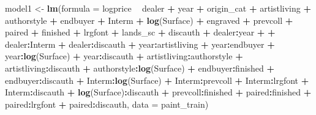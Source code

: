 \documentclass[]{article}
\newenvironment{Shaded}{\begin{snugshade}}{\end{snugshade}}
\newcommand{\DataTypeTok}[1]{\textcolor[rgb]{0.13,0.29,0.53}{#1}}
\newcommand{\KeywordTok}[1]{\textcolor[rgb]{0.13,0.29,0.53}{\textbf{#1}}}
\newcommand{\NormalTok}[1]{#1}
\newcommand{\OperatorTok}[1]{\textcolor[rgb]{0.81,0.36,0.00}{\textbf{#1}}}
\newcommand{\StringTok}[1]{\textcolor[rgb]{0.31,0.60,0.02}{#1}}
\begin{document}
\begin{Shaded}
\begin{Highlighting}[]
\NormalTok{model1 <-}\StringTok{ }\KeywordTok{lm}\NormalTok{(}\DataTypeTok{formula =}\NormalTok{ logprice }\OperatorTok{~}\StringTok{ }\NormalTok{dealer }\OperatorTok{+}\StringTok{ }\NormalTok{year }\OperatorTok{+}\StringTok{ }\NormalTok{origin_cat }\OperatorTok{+}\StringTok{ }\NormalTok{artistliving }\OperatorTok{+}\StringTok{ }
\StringTok{                   }\NormalTok{authorstyle }\OperatorTok{+}\StringTok{ }\NormalTok{endbuyer }\OperatorTok{+}\StringTok{ }\NormalTok{Interm }\OperatorTok{+}\StringTok{ }\KeywordTok{log}\NormalTok{(Surface) }\OperatorTok{+}\StringTok{ }\NormalTok{engraved }\OperatorTok{+}\StringTok{ }\NormalTok{prevcoll }\OperatorTok{+}
\StringTok{                   }\NormalTok{paired }\OperatorTok{+}\StringTok{ }\NormalTok{finished }\OperatorTok{+}\StringTok{ }\NormalTok{lrgfont }\OperatorTok{+}\StringTok{ }\NormalTok{lands_sc }\OperatorTok{+}\StringTok{ }\NormalTok{discauth }\OperatorTok{+}\StringTok{ }\NormalTok{dealer}\OperatorTok{:}\NormalTok{year }\OperatorTok{+}\StringTok{ }
\StringTok{                   }\OperatorTok{+}\StringTok{ }\NormalTok{dealer}\OperatorTok{:}\NormalTok{Interm }\OperatorTok{+}\StringTok{ }\NormalTok{dealer}\OperatorTok{:}\NormalTok{discauth }\OperatorTok{+}\StringTok{ }\NormalTok{year}\OperatorTok{:}\NormalTok{artistliving }\OperatorTok{+}\StringTok{ }
\StringTok{                   }\NormalTok{year}\OperatorTok{:}\NormalTok{endbuyer }\OperatorTok{+}\StringTok{ }\NormalTok{year}\OperatorTok{:}\KeywordTok{log}\NormalTok{(Surface) }\OperatorTok{+}\StringTok{ }\NormalTok{year}\OperatorTok{:}\NormalTok{discauth }\OperatorTok{+}\StringTok{ }
\StringTok{                   }\NormalTok{artistliving}\OperatorTok{:}\NormalTok{authorstyle }\OperatorTok{+}\StringTok{ }\NormalTok{artistliving}\OperatorTok{:}\NormalTok{discauth }\OperatorTok{+}\StringTok{ }
\StringTok{                   }\NormalTok{authorstyle}\OperatorTok{:}\KeywordTok{log}\NormalTok{(Surface) }\OperatorTok{+}\StringTok{ }\NormalTok{endbuyer}\OperatorTok{:}\NormalTok{finished }\OperatorTok{+}\StringTok{ }
\StringTok{                   }\NormalTok{endbuyer}\OperatorTok{:}\NormalTok{discauth }\OperatorTok{+}\StringTok{ }\NormalTok{Interm}\OperatorTok{:}\KeywordTok{log}\NormalTok{(Surface) }\OperatorTok{+}\StringTok{ }\NormalTok{Interm}\OperatorTok{:}\NormalTok{prevcoll }\OperatorTok{+}\StringTok{ }
\StringTok{                   }\NormalTok{Interm}\OperatorTok{:}\NormalTok{lrgfont }\OperatorTok{+}\StringTok{ }\NormalTok{Interm}\OperatorTok{:}\NormalTok{discauth }\OperatorTok{+}\StringTok{ }\KeywordTok{log}\NormalTok{(Surface)}\OperatorTok{:}\NormalTok{discauth }\OperatorTok{+}\StringTok{ }
\StringTok{                   }\NormalTok{prevcoll}\OperatorTok{:}\NormalTok{finished }\OperatorTok{+}\StringTok{ }\NormalTok{paired}\OperatorTok{:}\NormalTok{finished }\OperatorTok{+}\StringTok{ }
\StringTok{                   }\NormalTok{paired}\OperatorTok{:}\NormalTok{lrgfont }\OperatorTok{+}\StringTok{ }\NormalTok{paired}\OperatorTok{:}\NormalTok{discauth, }\DataTypeTok{data =}\NormalTok{ paint_train)}



\end{Highlighting}
\end{Shaded}
\end{document}
